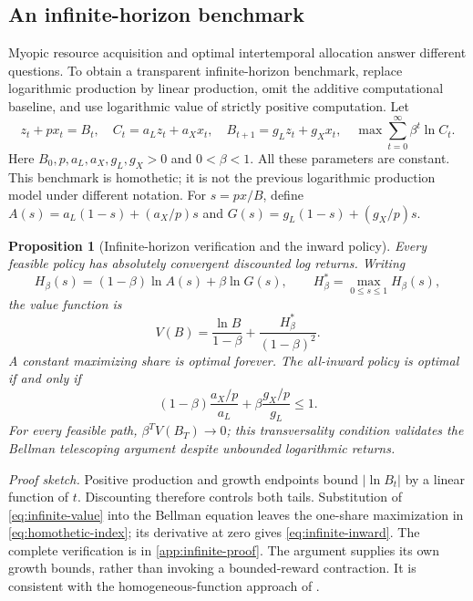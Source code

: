 \documentclass[11pt,a4paper]{article}
\newtheorem{proposition}{Proposition}
\theoremstyle{definition}\newtheorem{definition}{Definition}
\begin{document}
\subsection{An infinite-horizon benchmark}
\label{sec:dynamic}
Myopic resource acquisition and optimal intertemporal allocation answer
different questions. To obtain a transparent infinite-horizon benchmark,
replace logarithmic production by linear production, omit the additive
computational baseline, and use logarithmic value of strictly positive
computation. Let
\begin{equation}
 z_t+px_t=B_t,\quad C_t=a_Lz_t+a_Xx_t,\quad
 B_{t+1}=g_Lz_t+g_Xx_t,\quad
 \max\sum_{t=0}^{\infty}\beta^t\ln C_t.
 \label{eq:infinite-model}
\end{equation}
Here $B_0,p,a_L,a_X,g_L,g_X>0$ and $0<\beta<1$.
All these parameters are constant. This benchmark is homothetic; it is
not the previous logarithmic production model under different notation.
For $s=px/B$, define
$A(s)=a_L(1-s)+(a_X/p)s$ and
$G(s)=g_L(1-s)+(g_X/p)s$.

\begin{proposition}[Infinite-horizon verification and the inward policy]
\label{prop:infinite}
Every feasible policy has absolutely convergent discounted log returns.
Writing
\begin{equation}
 H_\beta(s)=(1-\beta)\ln A(s)+\beta\ln G(s),\qquad
 H_\beta^*=\max_{0\leq s\leq1}H_\beta(s),
 \label{eq:homothetic-index}
\end{equation}
the value function is
\begin{equation}
 V(B)=\frac{\ln B}{1-\beta}
       +\frac{H_\beta^*}{(1-\beta)^2}.
 \label{eq:infinite-value}
\end{equation}
A constant maximizing share is optimal forever. The all-inward policy
is optimal if and only if
\begin{equation}
 (1-\beta)\frac{a_X/p}{a_L}
       +\beta\frac{g_X/p}{g_L}\leq1.
 \label{eq:infinite-inward}
\end{equation}
For every feasible path, $\beta^T V(B_T)\to0$; this transversality
condition validates the Bellman telescoping argument despite unbounded
logarithmic returns.
\end{proposition}
\noindent\emph{Proof sketch.}
Positive production and growth endpoints bound $|\ln B_t|$ by a linear
function of $t$. Discounting therefore controls both tails. Substitution
of \cref{eq:infinite-value} into the Bellman equation leaves the one-share
maximization in \cref{eq:homothetic-index}; its derivative at zero gives
\cref{eq:infinite-inward}. The complete verification is in
\cref{app:infinite-proof}. The argument supplies its own growth bounds,
rather than invoking a bounded-reward contraction. It is consistent with
the homogeneous-function approach of \citet{AlvarezStokey1998}.
\end{document}
